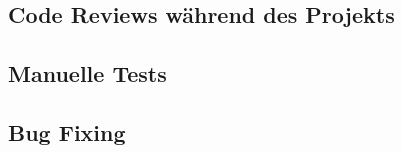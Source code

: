 \subsection{Code Reviews während des Projekts}
\label{Code Reviews während des Projekts}

\subsection{Manuelle Tests}
\label{Manuelle Tests}

\subsection{Bug Fixing}
\label{Bug Fixing}